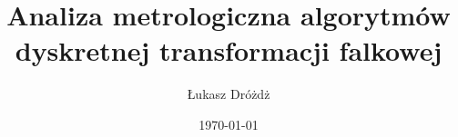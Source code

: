 \documentclass[a4paper, 12pt, polish, twoside, openright]{thesis}
\title{Analiza metrologiczna algorytmów dyskretnej transformacji falkowej}
\author{Łukasz Dróżdż}
\date{\today}
\begin{document}
\maketitle
\preface


\body






\appendix
\end{document}
